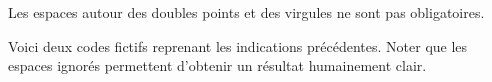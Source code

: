 \documentclass[10pt, a4paper]{article}
\begin{document}


\begin{tdocnote}
    Les espaces autour des doubles points et des virgules ne sont pas obligatoires.
\end{tdocnote}




Voici deux codes fictifs reprenant les indications précédentes. Noter que les espaces ignorés permettent d'obtenir un résultat humainement clair.
\begin{multicols}{2}

\end{multicols}
\end{document}
